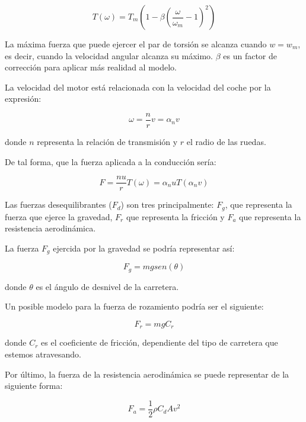 \documentclass[12pt]{article}
\begin{document}
\begin{equation}
  T(\omega) = T_m \left(1 - \beta \left(\dfrac{\omega}{\omega_m}-1\right)^2\right)
\end{equation}

La máxima fuerza que puede ejercer el par de torsión se alcanza cuando $w=w_m$, es decir, cuando la velocidad
angular alcanza su máximo. $\beta$ es un factor de corrección para aplicar más realidad al modelo.

La velocidad del motor está relacionada con la velocidad del coche por la expresión:

\begin{equation}
  \omega = \dfrac{n}{r} v = \alpha_n v
\end{equation}

donde $n$ representa la relación de transmisión y $r$ el radio de las ruedas.

De tal forma, que la fuerza aplicada a la conducción sería:

\begin{equation}
  F = \dfrac{nu}{r} T(\omega) = \alpha_n u T(\alpha_n v)
\end{equation}

Las fuerzas desequilibrantes ($F_d$) son tres principalmente: $F_g$, que representa la fuerza que ejerce
la gravedad, $F_r$ que representa la fricción y $F_a$ que representa la resistencia aerodinámica.

La fuerza $F_g$ ejercida por la gravedad se podría representar así:

\begin{equation}
  F_g = m g sen(\theta)
\end{equation}

donde $\theta$ es el ángulo de desnivel de la carretera.

Un posible modelo para la fuerza de rozamiento podría ser el siguiente:

\begin{equation}
  F_r = m g C_r
\end{equation}

donde $C_r$ es el coeficiente de fricción, dependiente del tipo de carretera que estemos atravesando.

Por último, la fuerza de la resistencia aerodinámica se puede representar de la siguiente forma:

\begin{equation}
  F_a = \dfrac{1}{2} \rho C_d A v^2
\end{equation}
\end{document}
